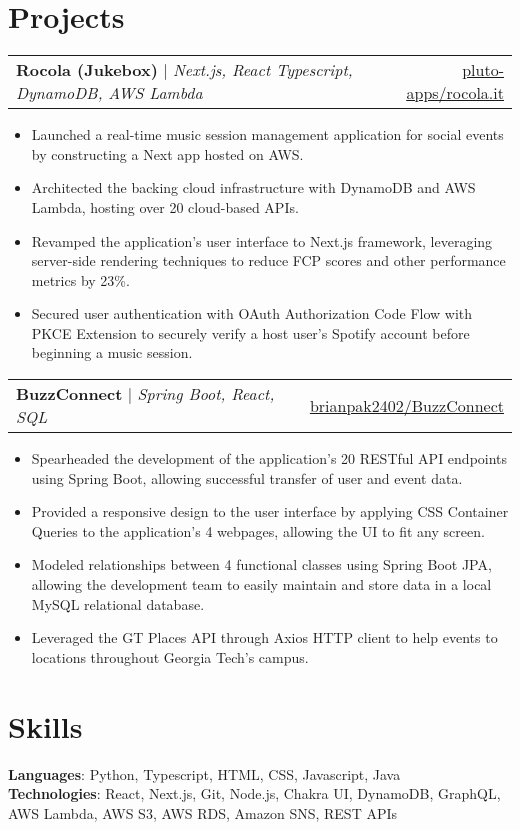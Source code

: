 \documentclass[letterpaper,11pt]{article}
\makeatletter
\newcommand{\resumeProjectHeading}[3]{
    \begin{tabular*}{0.97\textwidth}[t]{l@{\extracolsep{\fill}}r}
      \textbf{#1} $\vert$ \textit{#2}  & {#3}
    \end{tabular*}\vspace{-3pt}
}
\newcommand{\resumeItemListStart}{\begin{itemize}[noitemsep]\vspace{-4pt}}
\newcommand{\resumeItemListEnd}{\end{itemize}}
\makeatother
\begin{document}
\section{Projects}
    \resumeProjectHeading{Rocola (Jukebox)}{Next.js, React Typescript, DynamoDB, AWS Lambda }{\href{https://rocola.it/}{\underline{pluto-apps/rocola.it}}}
      \resumeItemListStart
        \item {Launched a real-time music session management application for social events by constructing a Next app hosted on AWS.}
        \item {Architected the backing cloud infrastructure with DynamoDB and AWS Lambda, hosting over 20 cloud-based APIs.}
        \item {Revamped the application's user interface to Next.js framework, leveraging server-side rendering techniques to reduce FCP scores and other performance metrics by 23\%.}
        \item {Secured user authentication with OAuth Authorization Code Flow with PKCE Extension to securely verify a host user's Spotify account before beginning a music session.}
      \resumeItemListEnd

    \resumeProjectHeading{BuzzConnect}{Spring Boot, React, SQL}{\underline{\href{https://github.com/brianpak2402/BuzzConnect}{brianpak2402/BuzzConnect}}}
      \resumeItemListStart
        \item {Spearheaded the development of the application's 20 RESTful API endpoints using Spring Boot, allowing successful transfer of user and event data.}
        \item {Provided a responsive design to the user interface by applying CSS Container Queries to the application's 4 webpages, allowing the UI to fit any screen.}
        \item {Modeled relationships between 4 functional classes using Spring Boot JPA, allowing the development team to easily maintain and store data in a local MySQL relational database.}
        \item {Leveraged the GT Places API through Axios HTTP client to help events to locations throughout Georgia Tech's campus.}
      \resumeItemListEnd

\section{Skills}
    \textbf{Languages}{: Python, Typescript, HTML, CSS, Javascript, Java } \\
    \textbf{Technologies}{: React, Next.js, Git, Node.js, Chakra UI, DynamoDB, GraphQL, AWS Lambda, AWS S3, AWS RDS, Amazon SNS, REST APIs}
\end{document}

